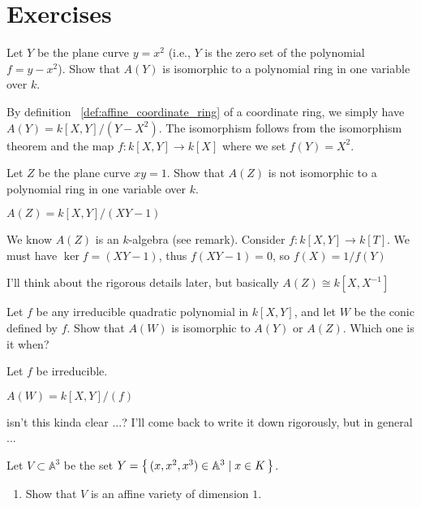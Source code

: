 \newpage
\section{Exercises}
%
%
\begin{exercise}[1.1. (a)]
    Let \( Y \) be the plane curve \( y = x^2 \) (i.e., \( Y \) is the zero set of the polynomial \( f = y - x^2 \)). Show that \( A(Y) \) is isomorphic to a polynomial ring in one variable over \( k \).
\end{exercise}
\begin{solution}
    By definition ~\ref{def:affine_coordinate_ring} of a coordinate ring, we simply have \(A(Y) = k[X, Y] / (Y - X^2)\). The isomorphism follows from the isomorphism theorem and the map \(f: k[X, Y] \rightarrow k[X]\) where we set \(f(Y) = X^2\).
\end{solution}
\begin{exercise}[1.1. (b)]
    Let \(Z\) be the plane curve \(xy = 1\). Show that \(A(Z)\) is not isomorphic to a polynomial ring in one variable over \(k\). 
\end{exercise}
\begin{solution}
    \(A(Z) = k[X, Y] / (XY - 1)\)

    We know \(A(Z)\) is an \(k\)-algebra (see remark). Consider \(f: k[X, Y] \longrightarrow k[T]\). We must have \(\ker{f} = (XY - 1)\), thus \(f(XY - 1) = 0\), so \(f(X) = 1 / f(Y)\)

    I'll think about the rigorous details later, but basically \(A(Z) \cong k[X, X^{-1}]\)
\end{solution}
\begin{exercise}[1.1. (c)]
    Let \(f\) be any irreducible quadratic polynomial in \(k[X, Y]\), and let \(W\) be the conic defined by \(f\). Show that \(A(W)\) is isomorphic to \(A(Y)\) or \(A(Z)\). Which one is it when?
\end{exercise}
\begin{solution}
    Let \(f\) be irreducible.

    \(A(W) = k[X, Y] / (f)\)
    
    isn't this kinda clear ...? I'll come back to write it down rigorously, but in general ...
\end{solution}
%
%
\begin{exercise}
    Let \(V \subset \mathbb{A}^3\) be the set \(Y = \left\{\, (x, x^2, x^3) \in \mathbb{A}^3 \mathrel{\mid} x \in K \,\right\}\).
    \begin{enumerate}
        \item Show that \(V\) is an affine variety of dimension \(1\).
    \end{enumerate}
\end{exercise}
